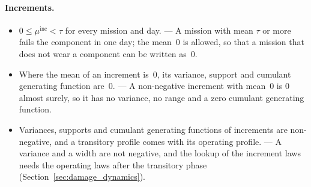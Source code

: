 \documentclass[11pt,a4paper]{article}
\theoremstyle{plain}
\theoremstyle{definition}
\theoremstyle{remark}
\begin{document}
\paragraph{Increments.}
\begin{itemize}[nosep]
  \item $0 \le \mu^{\mathrm{inc}} < \tau$ for every mission and day. --- A mission with mean $\tau$ or more fails the component in one day; the mean~$0$ is allowed, so that a mission that does not wear a component can be written as~$0$.
  \item Where the mean of an increment is~$0$, its variance, support and cumulant generating function are~$0$. --- A non-negative increment with mean~$0$ is $0$ almost surely, so it has no variance, no range and a zero cumulant generating function.
  \item Variances, supports and cumulant generating functions of increments are non-negative, and a transitory profile comes with its operating profile. --- A variance and a width are not negative, and the lookup of the increment laws needs the operating laws after the transitory phase (Section~\ref{sec:damage_dynamics}).
\end{itemize}
\end{document}

